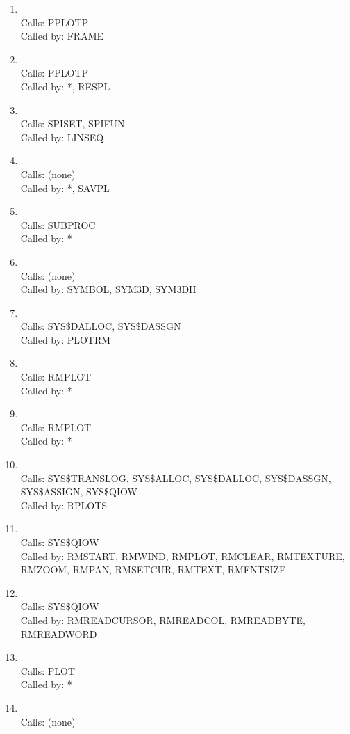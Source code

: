 \documentclass[11pt]{report}
\begin{document}
\begin{enumerate}
\item {}
\\ Calls:  PPLOTP
\\ Called by: FRAME
\item {}
\\ Calls:  PPLOTP
\\ Called by: *, RESPL
\item {}
\\ Calls:  SPISET, SPIFUN
\\ Called by: LINSEQ
\item {}
\\ Calls:  (none)
\\ Called by: *, SAVPL
\item {}
\\ Calls: SUBPROC
\\ Called by: *
\item {}
\\ Calls:  (none)
\\ Called by: SYMBOL, SYM3D, SYM3DH
\item {}
\\ Calls: SYS\$DALLOC, SYS\$DASSGN
\\ Called by: PLOTRM
\item {}
\\ Calls:  RMPLOT
\\ Called by: *
\item {}
\\ Calls:  RMPLOT
\\ Called by: *
\item {}
\\ Calls: SYS\$TRANSLOG, SYS\$ALLOC, SYS\$DALLOC, SYS\$DASSGN, SYS\$ASSIGN, SYS\$QIOW
\\ Called by: RPLOTS
\item {}
\\ Calls: SYS\$QIOW
\\ Called by: RMSTART, RMWIND, RMPLOT, RMCLEAR, RMTEXTURE, RMZOOM,
RMPAN, RMSETCUR, RMTEXT, RMFNTSIZE
\item {}
\\ Calls: SYS\$QIOW
\\ Called by: RMREADCURSOR, RMREADCOL, RMREADBYTE, RMREADWORD
\item {}
\\ Calls:  PLOT
\\ Called by: *
\item {}
\\ Calls: (none)

\end{enumerate}
\end{document}
